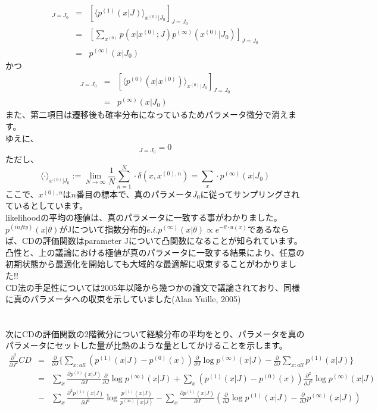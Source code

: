 \documentclass[11pt]{article}
\begin{document}
\begin{eqnarray}
	[\langle p^{(1)}(x|J)\rangle_{x^{(0)}|J_0}]_{J=J_0}&=&[\langle p^{(1)}(x|J)\rangle_{x^{(0)}|J_0}]_{J=J_0}\\
	&=&[\sum_{x^{(0)}}p(x|x^{(0)};J)p^{(\infty)}(x^{(0)}|J_0)]_{J=J_0}\\
	&=&p^{(\infty)}(x|J_0)
\end{eqnarray}
かつ
\begin{eqnarray}
	[\langle p^{(0)}(x)\rangle_{x^{(0)}|J_0}]_{J=J_0}&=&[\langle p^{(0)}(x|x^{(0)})\rangle_{x^{(0)}|J_0}]_{J=J_0}\\
	&=&p^{(\infty)}(x|J_0)
\end{eqnarray}
また、第二項目は遷移後も確率分布になっているためパラメータ微分で消えます。\\
ゆえに、
\begin{equation}
[\langle\frac{\partial}{\partial J}CD(p^{(0)}\|p^{(1)}(|J)) \rangle_{x^{(0)}|J_0}]_{J=J_0}=0
\end{equation}
ただし、
\begin{equation}
	\langle \cdot \rangle_{x^{(0)}|J_0}:=\lim_{N\to\infty}\frac{1}{N}\sum_{n=1}^{N}\cdot \delta(x,x^{(0),n}) = \sum_{x}\cdot p^{(\infty)}(x|J_0)
\end{equation}
ここで、$x^{(0),n}$は$n$番目の標本で、真のパラメータ$J_0$に従ってサンプリングされているとしています。\\
likelihoodの平均の極値は、真のパラメータに一致する事がわかりました。\\
$p^{(infty)}(x|\theta)$がJについて指数分布的$e.i.p^{(\infty)}(x|\theta)\propto e^{-\theta \cdot u(x)}$であるならば、CDの評価関数はparameter Jについて凸関数になることが知られています。凸性と、上の議論における極値が真のパラメータに一致する結果により、任意の初期状態から最適化を開始しても大域的な最適解に収束することがわかりました!!\\
CD法の手足性については2005年以降から幾つかの論文で議論されており、同様に真のパラメータへの収束を示していました(Alan Yuille, 2005)\\
\\
\\
次にCDの評価関数の2階微分について経験分布の平均をとり、パラメータを真のパラメータにセットした量が比熱のような量としてかけることを示します。\\
\begin{eqnarray}
	\frac{\partial^2}{\partial J^2}CD&=& \frac{\partial}{\partial J}\{ \sum_{x:all}(p^{(1)}(x|J)-p^{(0)}(x))\frac{\partial}{\partial J}\log p^{(\infty)}(x|J)-\frac{\partial}{\partial J}\sum_{x:all}p^{(1)}(x|J) \}\\
&=&\sum_{x}\frac{\partial p^{(1)}(x|J)}{\partial J}\frac{\partial}{\partial J}\log{p^{(\infty)}(x|J)}+\sum_{x}(p^{(1)}(x|J)-p^{(0)}(x))\frac{\partial^2}{\partial J^2}\log p^{(\infty)}(x|J)\\
&-&\sum_{x}\frac{\partial^2 p^{(1)}(x|J)}{\partial J^2}\log\frac{p^{(1)}(x|J)}{p^{(\infty)}(x|J)}-\sum_{x}\frac{\partial p^{(1)}(x|J)}{\partial J}(\frac{\partial}{\partial J}\log p^{(1)}(x|J)-\frac{\partial}{\partial J}p^{(\infty)}(x|J)) \nonumber
\end{eqnarray}
\end{document}
